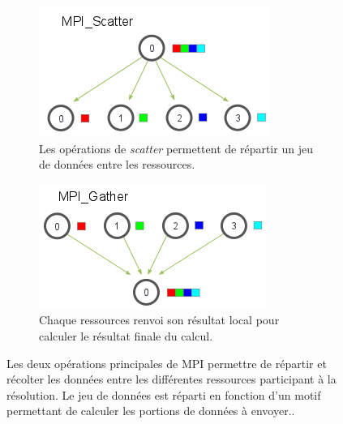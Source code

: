             
            \begin{figure}[t!]
                \centering
                \begin{subfigure}[t]{0.48\textwidth}
                    \centering
                    \includegraphics[width=.9\linewidth]{images/scatter.png}
                    \caption{\label{fig:scatter}Les opérations de \textit{scatter} permettent de répartir un jeu de données entre les ressources.}
                \end{subfigure}\hfill
            \begin{subfigure}[t]{0.48\textwidth}
                    \centering
                    \includegraphics[width=.9\linewidth]{images/gather.png}
                    \caption{\label{fig:gather}Chaque ressources renvoi son résultat local pour calculer le résultat finale du calcul.}
                \end{subfigure}
                \caption{\label{fig:scatter_gather}Les deux opérations principales de MPI permettre de répartir et récolter les données entre les différentes ressources participant à la résolution. Le jeu de données est réparti en fonction d'un motif permettant de calculer les portions de données à envoyer.\protect\footnotemark.}
            \end{figure}
           
